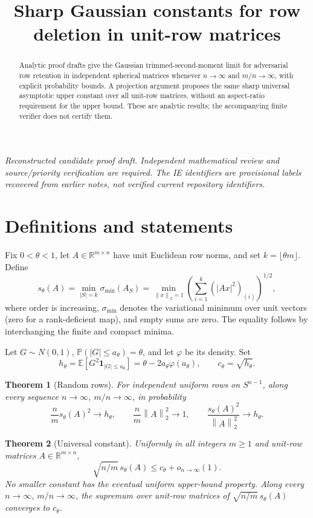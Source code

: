 \documentclass[11pt]{article}
\title{Sharp Gaussian constants for row deletion in unit-row matrices}
\author{}
\date{}
\newtheorem{theorem}{Theorem}
\newcommand{\R}{\mathbb R}
\newcommand{\norm}[1]{\left\lVert#1\right\rVert}
\newcommand{\E}{\mathbb E}
\newcommand{\Prob}{\mathbb P}
\begin{document}
\maketitle
\noindent\textit{Reconstructed candidate proof draft. Independent mathematical review and source/priority verification are required. The IE identifiers are provisional labels recovered from earlier notes, not verified current repository identifiers.}


\begin{abstract}
Analytic proof drafts give the Gaussian trimmed-second-moment limit for adversarial row retention in independent spherical matrices whenever $n\to\infty$ and $m/n\to\infty$, with explicit probability bounds. A projection argument proposes the same sharp universal asymptotic upper constant over all unit-row matrices, without an aspect-ratio requirement for the upper bound. These are analytic results; the accompanying finite verifier does not certify them.
\end{abstract}
\section{Definitions and statements}
Fix $0<\theta<1$, let $A\in\R^{m\times n}$ have unit Euclidean row norms, and set $k=\lfloor\theta m\rfloor$. Define
\[
s_\theta(A)=\min_{|S|=k}\sigma_{\min}(A_S)
=\min_{\norm x_2=1}\left(\sum_{i=1}^k(|Ax|^2)_{(i)}\right)^{1/2},
\]
where order is increasing, $\sigma_{\min}$ denotes the variational minimum over unit vectors (zero for a rank-deficient map), and empty sums are zero. The equality follows by interchanging the finite and compact minima.

Let $G\sim N(0,1)$, $\Prob(|G|\le a_\theta)=\theta$, and let $\varphi$ be its density. Set
\[
h_\theta=\E[G^2\mathbf1_{|G|\le a_\theta}]=\theta-2a_\theta\varphi(a_\theta),\qquad c_\theta=\sqrt{h_\theta}.
\]
\begin{theorem}[Random rows]
For independent uniform rows on $S^{n-1}$, along every sequence $n\to\infty$, $m/n\to\infty$, in probability
\[
\frac nm s_\theta(A)^2\to h_\theta,\qquad \frac nm\norm A_2^2\to1,\qquad
\frac{s_\theta(A)^2}{\norm A_2^2}\to h_\theta.
\]
\end{theorem}
\begin{theorem}[Universal constant]
Uniformly in all integers $m\ge1$ and unit-row matrices $A\in\R^{m\times n}$,
\[\sqrt{n/m}\,s_\theta(A)\le c_\theta+o_{n\to\infty}(1).\]
No smaller constant has the eventual uniform upper-bound property. Along every $n\to\infty$, $m/n\to\infty$, the supremum over unit-row matrices of $\sqrt{n/m}\,s_\theta(A)$ converges to $c_\theta$.
\end{theorem}
\end{document}
